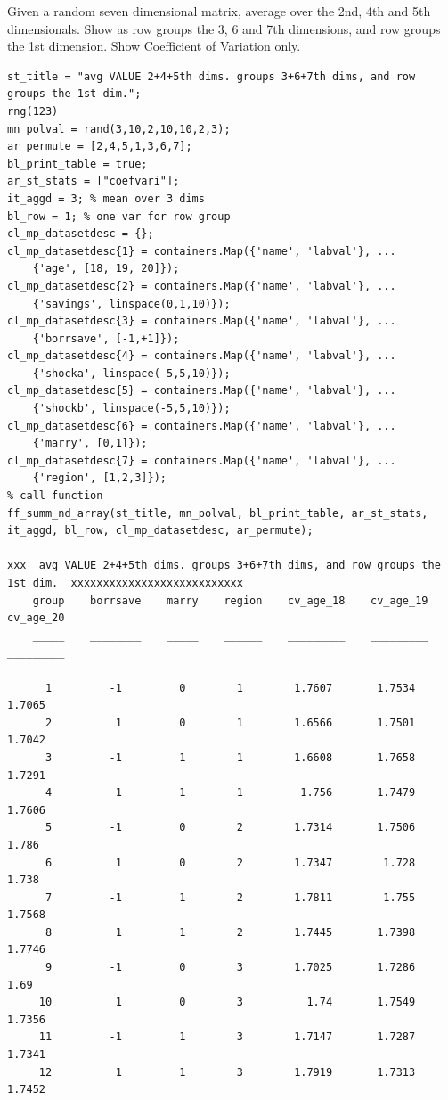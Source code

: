 \documentclass[
]{book}
\begin{document}
Given a random seven dimensional matrix, average over the 2nd, 4th and
5th dimensionals. Show as row groups the 3, 6 and 7th dimensions, and
row groups the 1st dimension. Show Coefficient of Variation only.

\begin{verbatim}
st_title = "avg VALUE 2+4+5th dims. groups 3+6+7th dims, and row groups the 1st dim.";
rng(123)
mn_polval = rand(3,10,2,10,10,2,3);
ar_permute = [2,4,5,1,3,6,7];
bl_print_table = true;
ar_st_stats = ["coefvari"];
it_aggd = 3; % mean over 3 dims
bl_row = 1; % one var for row group
cl_mp_datasetdesc = {};
cl_mp_datasetdesc{1} = containers.Map({'name', 'labval'}, ...
    {'age', [18, 19, 20]});
cl_mp_datasetdesc{2} = containers.Map({'name', 'labval'}, ...
    {'savings', linspace(0,1,10)});
cl_mp_datasetdesc{3} = containers.Map({'name', 'labval'}, ...
    {'borrsave', [-1,+1]});
cl_mp_datasetdesc{4} = containers.Map({'name', 'labval'}, ...
    {'shocka', linspace(-5,5,10)});
cl_mp_datasetdesc{5} = containers.Map({'name', 'labval'}, ...
    {'shockb', linspace(-5,5,10)});
cl_mp_datasetdesc{6} = containers.Map({'name', 'labval'}, ...
    {'marry', [0,1]});
cl_mp_datasetdesc{7} = containers.Map({'name', 'labval'}, ...
    {'region', [1,2,3]});
% call function
ff_summ_nd_array(st_title, mn_polval, bl_print_table, ar_st_stats, it_aggd, bl_row, cl_mp_datasetdesc, ar_permute);

xxx  avg VALUE 2+4+5th dims. groups 3+6+7th dims, and row groups the 1st dim.  xxxxxxxxxxxxxxxxxxxxxxxxxxx
    group    borrsave    marry    region    cv_age_18    cv_age_19    cv_age_20
    _____    ________    _____    ______    _________    _________    _________

      1         -1         0        1        1.7607       1.7534       1.7065  
      2          1         0        1        1.6566       1.7501       1.7042  
      3         -1         1        1        1.6608       1.7658       1.7291  
      4          1         1        1         1.756       1.7479       1.7606  
      5         -1         0        2        1.7314       1.7506        1.786  
      6          1         0        2        1.7347        1.728        1.738  
      7         -1         1        2        1.7811        1.755       1.7568  
      8          1         1        2        1.7445       1.7398       1.7746  
      9         -1         0        3        1.7025       1.7286         1.69  
     10          1         0        3          1.74       1.7549       1.7356  
     11         -1         1        3        1.7147       1.7287       1.7341  
     12          1         1        3        1.7919       1.7313       1.7452  
\end{verbatim}
\end{document}
